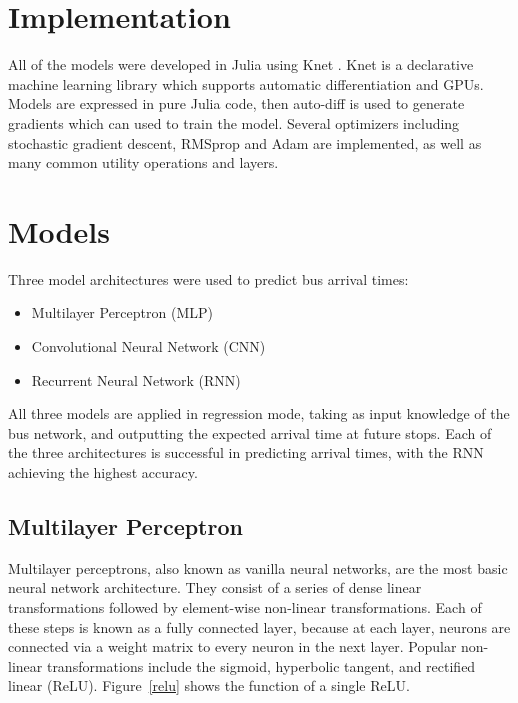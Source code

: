 \section{Implementation}

All of the models were developed in Julia \cite{bezanson2012julia} using Knet \cite{yuret2016knet}.
Knet is a declarative machine learning library which supports automatic differentiation and GPUs.
Models are expressed in pure Julia code, then auto-diff is used to generate gradients which can used to train the model.
Several optimizers including stochastic gradient descent, RMSprop and Adam are implemented, as well as many common utility operations and layers.

\section{Models}\label{models}

Three model architectures were used to predict bus arrival times:

\begin{itemize}
  \item Multilayer Perceptron (MLP)
  \item Convolutional Neural Network (CNN)
  \item Recurrent Neural Network (RNN)
\end{itemize}

All three models are applied in regression mode, taking as input knowledge of the bus network, and outputting the expected arrival time at future stops.
Each of the three architectures is successful in predicting arrival times, with the RNN achieving the highest accuracy.

\subsection{Multilayer Perceptron}

Multilayer perceptrons, also known as vanilla neural networks, are the most basic neural network architecture.
They consist of a series of dense linear transformations followed by element-wise non-linear transformations.
Each of these steps is known as a fully connected layer, because at each layer, neurons are connected via a weight matrix to every neuron in the next layer.
Popular non-linear transformations include the sigmoid, hyperbolic tangent, and rectified linear (ReLU).
Figure~\ref{relu} shows the function of a single ReLU.

